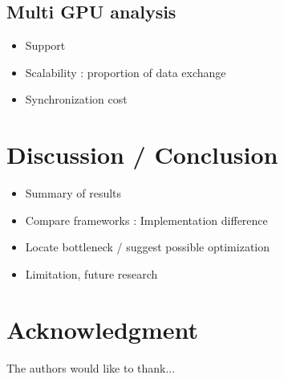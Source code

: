 \documentclass[conference]{IEEEtran}
\begin{document}
\subsection{Multi GPU analysis}

\begin{itemize}
  \item Support
  \item Scalability : proportion of data exchange
  \item Synchronization cost
\end{itemize}

\section{Discussion / Conclusion}

\begin{itemize}
  \item Summary of results
  \item Compare frameworks : Implementation difference
  \item Locate bottleneck / suggest possible optimization
  \item Limitation, future research
\end{itemize}

\section*{Acknowledgment}

The authors would like to thank...

\end{document}
